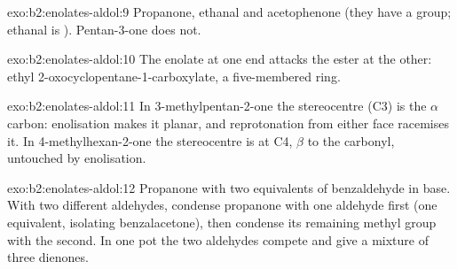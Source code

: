\begin{solution}{exo:b2:enolates-aldol:9}
Propanone, ethanal and acetophenone (they have a  group; ethanal is ).
Pentan-3-one does not.
\end{solution}

\begin{solution}{exo:b2:enolates-aldol:10}
The enolate at one end attacks the ester at the other: ethyl 2-oxocyclopentane-1-carboxylate, a
five-membered ring.
\end{solution}

\begin{solution}{exo:b2:enolates-aldol:11}
In 3-methylpentan-2-one the stereocentre (C3) is the $\alpha$ carbon: enolisation makes it planar, and
reprotonation from either face racemises it. In 4-methylhexan-2-one the stereocentre is at C4,
$\beta$ to the carbonyl, untouched by enolisation.
\end{solution}

\begin{solution}{exo:b2:enolates-aldol:12}
Propanone with two equivalents of benzaldehyde in base. With two different aldehydes, condense
propanone with one aldehyde first (one equivalent, isolating benzalacetone), then condense its
remaining methyl group with the second. In one pot the two aldehydes compete and give a mixture of
three dienones.
\end{solution}

